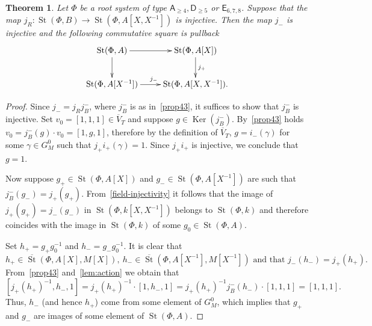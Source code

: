 \documentclass[oneside, 8pt]{amsart}
\newtheorem{externaltheorem}[lemma]{Theorem}
\theoremstyle{remark}
\theoremstyle{definition}
\numberwithin{lemma}{section}
\numberwithin{prop}{section}
\numberwithin{corollary}{section}
\numberwithin{externaltheorem}{section}
\DeclareMathOperator{\Ker}{Ker}
\DeclareMathOperator{\St}{St}
\newcommand{\inv}{^{-1}}
\newcommand{\rA}{\mathsf{A}}
\newcommand{\rD}{\mathsf{D}}
\newcommand{\rE}{\mathsf{E}}
\numberwithin{equation}{section}
\begin{document}
\begin{externaltheorem} \label{thm:P1glueing}
 Let $\Phi$ be a root system of type $\rA_{\geq 4}, \rD_{\geq 5}$ or $\rE_{6,7,8}$.
 Suppose that the map $j_R \colon \St(\Phi, B) \to \St(\Phi, A[X, X\inv])$ is injective.  
 Then the map $j_-$ is injective and the following commutative square is pullback
 \begin{equation} \nonumber
  \xymatrix{ \St(\Phi, A) \ar[r] \ar[d] & \St(\Phi, A[X]) \ar[d]^{j_+} \\ \St(\Phi, A[X\inv]) \ar[r]^{j_-} & \St(\Phi, A[X, X\inv]).}
 \end{equation}
\end{externaltheorem}
\begin{proof} Since $j_- = j_R j_B^-$, where $j_B^-$ is as in~\cref{prop43}, it suffices to show that $j_B^-$ is injective.
 Set $v_0 = [1, 1, 1] \in \overline{V}_T$ and suppose $g \in \Ker(j_B^-)$.
 By~\cref{prop43} holds $v_0 = j_B^-(g) \cdot v_0 = [1, g, 1]$, therefore by the definition of $\overline{V}_T$, $g = i_-(\gamma)$ for some $\gamma \in G_M^0$ such that $j_+i_+(\gamma) = 1$.
 Since $j_+i_+$ is injective, we conclude that $g = 1$.
 
 Now suppose $g_+ \in \St(\Phi, A[X])$ and $g_- \in \St(\Phi, A[X\inv])$ are such that $j_B^-(g_-) = j_+(g_+)$.
 From~\cref{field-injectivity} it follows that the image of $j_+(g_+) = j_-(g_-)$ in $\St(\Phi, k[X, X\inv])$ belongs to $\St(\Phi, k)$ and therefore coincides with the image in $\St(\Phi, k)$ of some $g_0 \in \St(\Phi, A)$.
 
 Set $h_+ = g_+g_0^{-1}$ and $h_- = g_-g_0^{-1}$.
 It is clear that \[ h_+ \in \overline{\St}(\Phi, A[X], M[X]),\ h_- \in \overline{\St}(\Phi, A[X\inv], M[X\inv])\text{ and that }j_-(h_-) = j_+(h_+).\]
 From~\cref{prop43} and~\cref{lem:action} we obtain that
 \[ [j_+(h_+)^{-1}, h_-, 1] = j_+(h_+)^{-1} \cdot [1, h_-, 1] = j_+(h_+)^{-1} j_B^-(h_-) \cdot [1, 1, 1] = [1, 1, 1]. \]
 Thus, $h_-$ (and hence $h_+$) come from some element of $G_M^0$, which implies that $g_+$ and $g_-$ are images of some element of $\St(\Phi, A)$.
 \end{proof}
  
\end{document}
